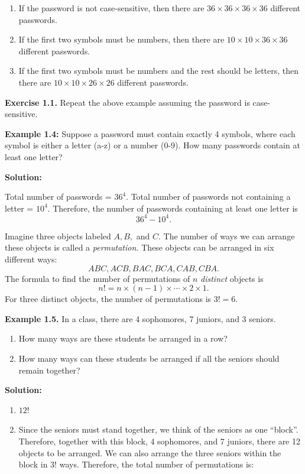 \documentclass[
  12pt,
]{krantzNoCorner}
\providecommand{\tightlist}{%
  \setlength{\itemsep}{0pt}\setlength{\parskip}{0pt}}
\begin{document}
\begin{enumerate}
\def\labelenumi{\arabic{enumi}.}
\tightlist
\item
  If the password is not case-sensitive, then there are
  \(36\times36\times36\times36\) different passwords.
\item
  If the first two symbols must be numbers, then there are
  \(10\times10\times36\times36\) different passwords.
\item
  If the first two symbols must be numbers and the rest should be
  letters, then there are \(10\times10\times26\times26\) different
  passwords.
\end{enumerate}

\textbf{Exercise 1.1.} Repeat the above example assuming the password is
case-sensitive.

\textbf{Example 1.4:} Suppose a password must contain exactly 4 symbols,
where each symbol is either a letter (a-z) or a number (0-9). How many
passwords contain at least one letter?

\textbf{Solution:}

Total number of passwords = \(36^4\). Total number of passwords not
containing a letter = \(10^4\). Therefore, the number of passwords
containing at least one letter is \[36^4-10^4.\]

Imagine three objects labeled \(A,B,\) and \(C.\) The number of ways we can
arrange these objects is called a \emph{permutation.} These objects can be
arranged in six different ways: \[ABC, ACB, BAC, BCA, CAB, CBA.\] The
formula to find the number of permutations of \(n\) \emph{distinct} objects is
\[n!=n\times (n-1)\times\cdots\times 2\times 1.\] For three distinct
objects, the number of permutations is \(3!=6.\)

\textbf{Example 1.5.} In a class, there are 4 sophomores, 7 juniors, and 3
seniors.

\begin{enumerate}
\def\labelenumi{\arabic{enumi}.}
\tightlist
\item
  How many ways are these students be arranged in a row?
\item
  How many ways can these students be arranged if all the seniors
  should remain together?
\end{enumerate}

\textbf{Solution:}

\begin{enumerate}
\def\labelenumi{\arabic{enumi}.}
\tightlist
\item
  \(12!\)
\item
  Since the seniors must stand together, we think of the seniors as
  one ``block''. Therefore, together with this block, 4 sophomores,
  and 7 juniors, there are 12 objects to be arranged. We can also
  arrange the three seniors within the block in \(3!\) ways. Therefore,
  the total number of permutations is:
\end{enumerate}
\end{document}
